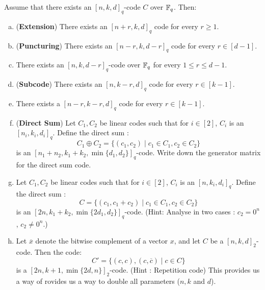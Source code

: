 \begin{exercise}
Assume that there exists an $[n,k,d]_q$-code $C$ over
${\mathbb{F}}_q$. Then:
\begin{enumerate}[(a)]
\item ({\bf Extension}) There exists an $[n+r,k,d]_q$ code for every $r \ge 1$.
\item (\textbf{Puncturing}) There exists an $[n-r,k,d-r]_q$ code for every $r \in [d-1]$.
\item There exists an $[n,k,d-r]_q$-code over ${\mathbb{F}}_q$ for every $1 \le r \le d-1$.
\item ({\bf Subcode}) There exists an $[n,k-r,d]_q$ code for every $r \in [k-1]$.
\item There exists a $[n-r,k-r,d]_q$ code for every $r \in [k-1]$.
\item (\textbf{Direct Sum}) Let $C_1, C_2$ be linear codes such that for $i \in [2]$, $C_i$ is an $[n_i,k_i,d_i]_q$. Define the direct sum :
$$C_1 \oplus C_2 = \{(c_1,c_2)\mid c_1 \in C_1, c_2 \in C_2 \}$$
is an $[n_1+n_2,k_1+k_2,\min\{d_1,d_2\}]_q$-code. Write down the generator matrix for the direct sum code.
\item Let $C_1, C_2$ be linear codes such that for $i \in [2]$, $C_i$ is an $[n,k_i,d_i]_q$. Define the direct sum :
$$C = \{(c_1,c_1+c_2)\mid c_1 \in C_1, c_2 \in C_2 \}$$
is an $[2n,k_1+k_2,\min\{2d_1,d_2\}]_q$-code. (Hint: Analyse in two cases : $c_2=0^n$, $c_2 \ne 0^n$.)
\item Let $\overline{x}$ denote the bitwise complement of a vector $x$, and let $C$ be a $[n,k,d]_2$-code. Then the code:
$$C' = \{ (c,c),(c,\overline{c}) \mid c \in C \}$$
is a $[2n,k+1,\min\{2d,n\}]_2$-code. (Hint : Repetition code) This provides us a way of rovides us a way to double all parameters ($n,k$ and $d$).
\end{enumerate}
\end{exercise}

